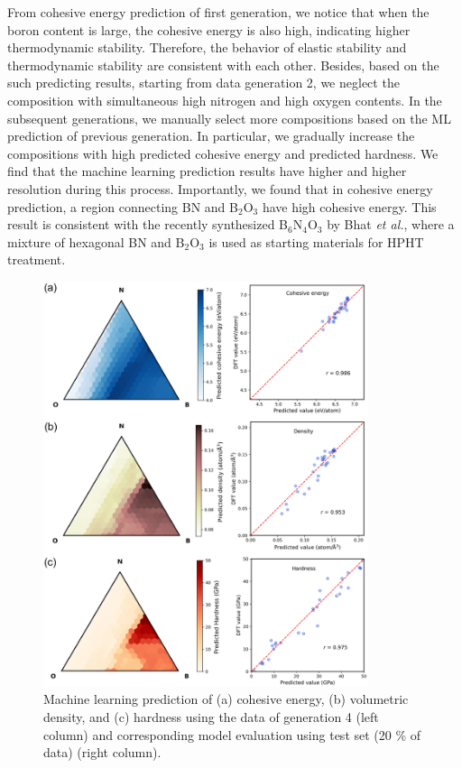     From cohesive energy prediction of first generation, we notice that when the boron content is large, the cohesive energy is also high, indicating higher thermodynamic stability. Therefore, the behavior of elastic stability and thermodynamic stability are consistent with each other. Besides, based on the such predicting results, starting from data generation 2, we neglect the composition with simultaneous high nitrogen and high oxygen contents. In the subsequent generations, we manually select more compositions based on the ML prediction of previous generation. In particular, we gradually increase the compositions with high predicted cohesive energy and predicted hardness. We find that the machine learning prediction results have higher and higher resolution during this process. Importantly, we found that in cohesive energy prediction, a region connecting BN and B$_2$O$_3$ have high cohesive energy. This result is consistent with the recently synthesized B$_6$N$_4$O$_3$ by Bhat {\it et al.}, where a mixture of hexagonal BN and B$_2$O$_3$ is used as starting materials for HPHT treatment.

	\begin{figure}[htbp]
        \centering
        \captionsetup{singlelinecheck = false, justification=justified}
        \includegraphics[width=0.85\textwidth]{BNO_3_model.png}
        \caption[Machine learning prediction of cohesive energy, density, and hardness as well as corresponding model evaluations.]{Machine learning prediction of (a) cohesive energy, (b) volumetric density, and (c) hardness using the data of generation 4 (left column) and corresponding model evaluation using test set (20 \% of data) (right column).}
        \label{fig:BNO_3_model}
    \end{figure}
    \pagebreak

